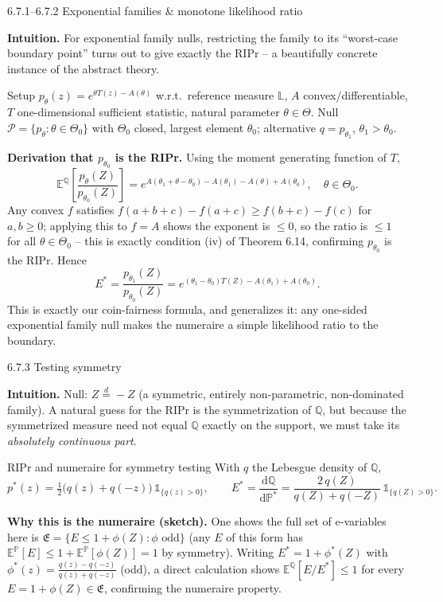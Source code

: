 \documentclass[aspectratio=169,10pt]{beamer}
\newcommand{\bE}{\mathbb{E}}
\newcommand{\bP}{\mathbb{P}}
\newcommand{\bQ}{\mathbb{Q}}
\newcommand{\cP}{\mathcal{P}}
\newcommand{\cE}{\mathfrak{E}}
\begin{document}
\begin{frame}[allowframebreaks]{6.7.1--6.7.2 Exponential families \& monotone likelihood ratio}

\textbf{Intuition.} For exponential family nulls, restricting the
family to its ``worst-case boundary point'' turns out to give exactly
the RIPr -- a beautifully concrete instance of the abstract theory.

\begin{block}{Setup}
$p_\theta(z) = e^{\theta T(z) - A(\theta)}$ w.r.t.\ reference measure
$\mathbb{L}$, $A$ convex/differentiable, $T$ one-dimensional sufficient
statistic, natural parameter $\theta \in \Theta$. Null
$\cP = \{p_\theta : \theta \in \Theta_0\}$ with $\Theta_0$ closed,
largest element $\theta_0$; alternative $q = p_{\theta_1}$, $\theta_1>\theta_0$.
\end{block}

\textbf{Derivation that $p_{\theta_0}$ is the RIPr.} Using the moment
generating function of $T$,
\[
\bE^{\bQ}\!\left[\frac{p_\theta(Z)}{p_{\theta_0}(Z)}\right]
= e^{A(\theta_1+\theta-\theta_0) - A(\theta_1) - A(\theta) + A(\theta_0)}, \quad \theta \in \Theta_0.
\]
Any convex $f$ satisfies $f(a+b+c)-f(a+c) \ge f(b+c)-f(c)$ for $a,b\ge0$;
applying this to $f=A$ shows the exponent is $\le 0$, so the ratio is
$\le 1$ for all $\theta\in\Theta_0$ -- this is exactly condition (iv)
of Theorem 6.14, confirming $p_{\theta_0}$ is the RIPr. Hence
\[
E^* = \frac{p_{\theta_1}(Z)}{p_{\theta_0}(Z)} = e^{(\theta_1-\theta_0)T(Z) - A(\theta_1)+A(\theta_0)}.
\]
This is exactly our coin-fairness formula, and generalizes it: any
one-sided exponential family null makes the numeraire a simple
likelihood ratio to the boundary.
\end{frame}

\begin{frame}{6.7.3 Testing symmetry}

\textbf{Intuition.} Null: $Z \stackrel{d}{=} -Z$ (a symmetric, entirely
non-parametric, non-dominated family). A natural guess for the RIPr is
the symmetrization of $\bQ$, but because the symmetrized measure need
not equal $\bQ$ exactly on the support, we must take its
\emph{absolutely continuous part}.

\begin{block}{RIPr and numeraire for symmetry testing}
With $q$ the Lebesgue density of $\bQ$,
\[
p^*(z) = \tfrac12\big(q(z)+q(-z)\big)\,\mathbb{1}_{\{q(z)>0\}},
\qquad
E^* = \frac{\mathrm{d}\bQ}{\mathrm{d}\bP^*} = \frac{2\,q(Z)}{q(Z)+q(-Z)}\,\mathbb{1}_{\{q(Z)>0\}}.
\]
\end{block}

\textbf{Why this is the numeraire (sketch).} One shows the full set of
e-variables here is $\cE = \{E \le 1+\phi(Z): \phi \text{ odd}\}$
(any $E$ of this form has $\bE^{\bP}[E] \le 1+\bE^{\bP}[\phi(Z)]=1$
by symmetry). Writing $E^* = 1+\phi^*(Z)$ with
$\phi^*(z) = \frac{q(z)-q(-z)}{q(z)+q(-z)}$ (odd), a direct calculation
shows $\bE^{\bQ}[E/E^*] \le 1$ for every $E=1+\phi(Z)\in\cE$, confirming
the numeraire property.
\end{frame}
\end{document}
